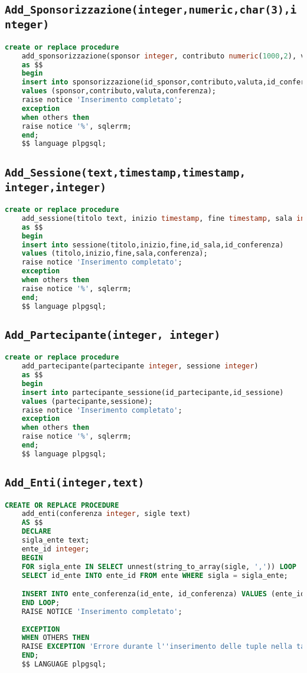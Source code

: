 \subsection{\texttt{Add\_Sponsorizzazione(integer,numeric,char(3),integer)}}
\begin{lstlisting}[language=SQL, style=mystyle]
	create or replace procedure 
	add_sponsorizzazione(sponsor integer, contributo numeric(1000,2), valuta char(3), conferenza integer)
	as $$
	begin
	insert into sponsorizzazione(id_sponsor,contributo,valuta,id_conferenza)
	values (sponsor,contributo,valuta,conferenza);
	raise notice 'Inserimento completato';
	exception
	when others then
	raise notice '%', sqlerrm;
	end;
	$$ language plpgsql;
\end{lstlisting}
\subsection{\texttt{Add\_Sessione(text,timestamp,timestamp, integer,integer)}}
\begin{lstlisting}[language=SQL, style=mystyle]
	create or replace procedure 
	add_sessione(titolo text, inizio timestamp, fine timestamp, sala integer, conferenza integer)
	as $$
	begin
	insert into sessione(titolo,inizio,fine,id_sala,id_conferenza)
	values (titolo,inizio,fine,sala,conferenza);
	raise notice 'Inserimento completato';
	exception
	when others then
	raise notice '%', sqlerrm;
	end;
	$$ language plpgsql;
\end{lstlisting}
\subsection{\texttt{Add\_Partecipante(integer, integer)}}
\begin{lstlisting}[language=SQL, style=mystyle]
	create or replace procedure 
	add_partecipante(partecipante integer, sessione integer)
	as $$
	begin
	insert into partecipante_sessione(id_partecipante,id_sessione)
	values (partecipante,sessione);
	raise notice 'Inserimento completato';
	exception
	when others then
	raise notice '%', sqlerrm;
	end;
	$$ language plpgsql;
\end{lstlisting}
\subsection{\texttt{Add\_Enti(integer,text)}}
\begin{lstlisting}[language=SQL,style=mystyle]
	CREATE OR REPLACE PROCEDURE 
	add_enti(conferenza integer, sigle text)
	AS $$
	DECLARE
	sigla_ente text;
	ente_id integer;
	BEGIN
	FOR sigla_ente IN SELECT unnest(string_to_array(sigle, ',')) LOOP
	SELECT id_ente INTO ente_id FROM ente WHERE sigla = sigla_ente;

	INSERT INTO ente_conferenza(id_ente, id_conferenza) VALUES (ente_id, conferenza);
	END LOOP;
	RAISE NOTICE 'Inserimento completato';
	
	EXCEPTION
	WHEN OTHERS THEN
	RAISE EXCEPTION 'Errore durante l''inserimento delle tuple nella tabella ente_conferenza: %', SQLERRM;
	END;
	$$ LANGUAGE plpgsql;
\end{lstlisting}
